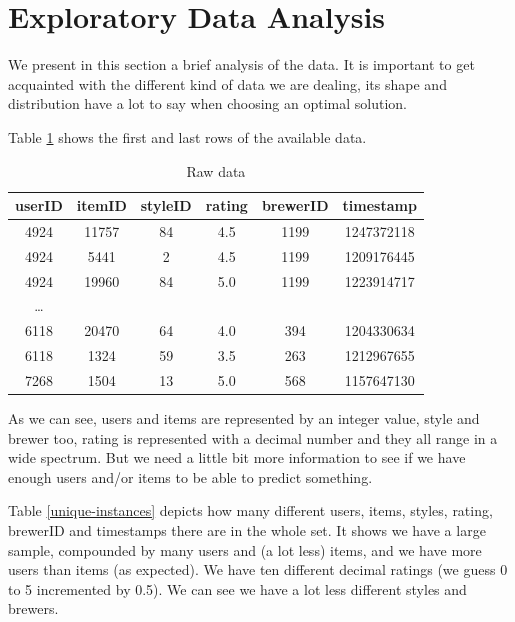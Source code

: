 \documentclass[letterpaper, 10 pt, conference]{ieeeconf}  %
\begin{document}
\section{Exploratory Data Analysis}

We present in this section a brief analysis of the data. It is important to get acquainted with the different kind of data we are dealing, its shape and distribution have a lot to say when choosing an optimal solution.

Table \ref{raw-data} shows the first and last rows of the available data. 

\begin{table}[]
\centering
\begin{tabular}{|c|c|c|c|c|c|}
\hline 
\rowcolor[HTML]{DAE8FC} 
userID & itemID & styleID & rating & brewerID & timestamp  \\ \hline \hline
4924   & 11757  & 84      & 4.5    & 1199     & 1247372118 \\ \hline
4924   & 5441   & 2       & 4.5    & 1199     & 1209176445 \\ \hline
4924   & 19960  & 84      & 5.0    & 1199     & 1223914717 \\ \hline
\dots       &        &         &        &          &            \\ \hline
6118   & 20470  & 64      & 4.0    & 394      & 1204330634 \\ \hline
6118   & 1324   & 59      & 3.5    & 263      & 1212967655 \\ \hline
7268   & 1504   & 13      & 5.0    & 568      & 1157647130 \\ \hline
\end{tabular}
\caption{Raw data}
\label{raw-data}
\end{table}

As we can see, users and items are represented by an integer value, style and brewer too, rating is represented with a decimal number and they all range in a wide spectrum. But we need a little bit more information to see if we have enough users and/or items to be able to predict something.

Table \ref{unique-instances} depicts how many different users, items, styles, rating, brewerID and timestamps there are in the whole set. It shows we have a large sample, compounded by many users and (a lot less) items, and we have more users than items (as expected). We have ten different decimal ratings (we guess 0 to 5 incremented by 0.5). We can see we have a lot less different styles and brewers.
\end{document}
